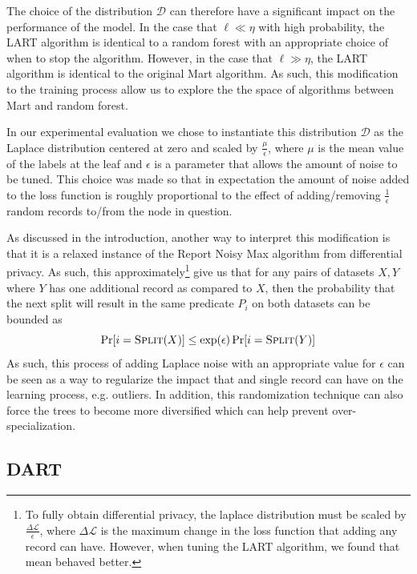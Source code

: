 \documentclass{article} %
\begin{document}
The choice of the distribution $\mathcal{D}$ can therefore have a significant impact on the performance of the model. In the case that $\ell \ll \eta$ with high probability,  the LART algorithm is identical to a random forest with an appropriate choice of when to stop the algorithm. However, in the case that $\ell \gg \eta$, the LART algorithm is identical to the original Mart algorithm. As such, this modification to the training process allow us to explore the the space of algorithms between Mart and random forest.

In our experimental evaluation we chose to instantiate this distribution $\mathcal{D}$ as the Laplace distribution centered at zero and scaled by $\frac{\mu}{\epsilon}$, where $\mu$ is the mean value of the labels at the leaf and $\epsilon$ is a parameter that allows the amount of noise to be tuned. This choice was made so that in expectation the amount of noise added to the loss function is roughly proportional to the effect of adding/removing $\frac{1}{\epsilon}$ random records to/from the node in question. 



As discussed in the introduction, another way to interpret this modification is that it is a relaxed instance of the Report Noisy Max\cite{Dwork} algorithm from differential privacy. As such, this approximately\footnote{To fully obtain differential privacy, the laplace distribution must be scaled by $\frac{ \Delta\mathcal{L}}{\epsilon}$, where $\Delta\mathcal{L}$ is the maximum change in the loss function that adding any record can have. However, when tuning the LART algorithm, we found that mean behaved better.} give us that for any pairs of datasets $X,Y$ where $Y$ has one additional record as compared to $X$, then the probability that the next split will result in the same predicate $P_i$ on both datasets can be bounded as
$$
	\Pr[i = \textsc{Split}(X)] \leq \exp(\epsilon)\Pr[i =\textsc{Split}(Y)]
$$
As such, this process of adding Laplace noise with an appropriate value for $\epsilon$ can be seen as a way to regularize the impact that and single record can have on the learning process, e.g. outliers. In addition, this randomization technique can also force the trees to become more diversified which can help prevent over-specialization.

\subsection{DART}
\end{document}
